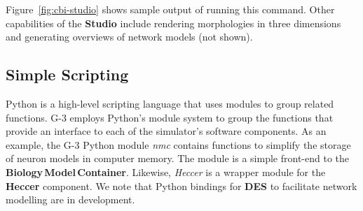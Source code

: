 \documentclass{article}
\begin{document}
Figure~\ref{fig:cbi-studio} shows sample output of running this
command.  Other capabilities of the {\bf Studio} include rendering
morphologies in three dimensions and generating overviews of network
models (not shown). 


\subsection{Simple Scripting}
\label{ss-apens}

Python is a high-level scripting language that uses modules to group
related functions.  G-3 employs Python's module system to group the
functions that provide an interface to each of the simulator's
software components.
As an example, the G-3 Python module {\it nmc} contains functions to
simplify the storage of neuron models in computer memory.  The module
is a simple front-end to the {\bf Biology\,Model\,Container}.
Likewise, {\it Heccer} is a wrapper module for the {\bf Heccer}
component.  We note that Python bindings for {\bf DES} to facilitate network modelling are in development.
\end{document}

